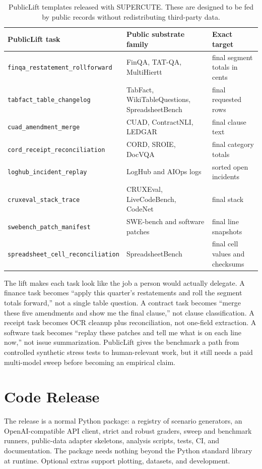 \documentclass[10pt,twocolumn]{article}
\newcommand{\task}[1]{\texttt{#1}}
\begin{document}
\begin{table}[t]
\centering
\small
\begin{tabular}{lll}
\toprule
PublicLift task & Public substrate family & Exact target \\
\midrule
\task{finqa\_restatement\_rollforward} & FinQA, TAT-QA, MultiHiertt & final segment totals in cents \\
\task{tabfact\_table\_changelog} & TabFact, WikiTableQuestions, SpreadsheetBench & final requested rows \\
\task{cuad\_amendment\_merge} & CUAD, ContractNLI, LEDGAR & final clause text \\
\task{cord\_receipt\_reconciliation} & CORD, SROIE, DocVQA & final category totals \\
\task{loghub\_incident\_replay} & LogHub and AIOps logs & sorted open incidents \\
\task{cruxeval\_stack\_trace} & CRUXEval, LiveCodeBench, CodeNet & final stack \\
\task{swebench\_patch\_manifest} & SWE-bench and software patches & final line snapshots \\
\task{spreadsheet\_cell\_reconciliation} & SpreadsheetBench & final cell values and checksums \\
\bottomrule
\end{tabular}
\caption{PublicLift templates released with SUPERCUTE. These are designed to be fed by public records without redistributing third-party data.}
\label{tab:publiclift}
\end{table}

The lift makes each task look like the job a person would actually delegate. A finance task becomes ``apply this quarter's restatements and roll the segment totals forward,'' not a single table question. A contract task becomes ``merge these five amendments and show me the final clause,'' not clause classification. A receipt task becomes OCR cleanup plus reconciliation, not one-field extraction. A software task becomes ``replay these patches and tell me what is on each line now,'' not issue summarization. PublicLift gives the benchmark a path from controlled synthetic stress tests to human-relevant work, but it still needs a paid multi-model sweep before becoming an empirical claim.

\section{Code Release}
The release is a normal Python package: a registry of scenario generators, an OpenAI-compatible API client, strict and robust graders, sweep and benchmark runners, public-data adapter skeletons, analysis scripts, tests, CI, and documentation. The package needs nothing beyond the Python standard library at runtime. Optional extras support plotting, datasets, and development.
\end{document}
